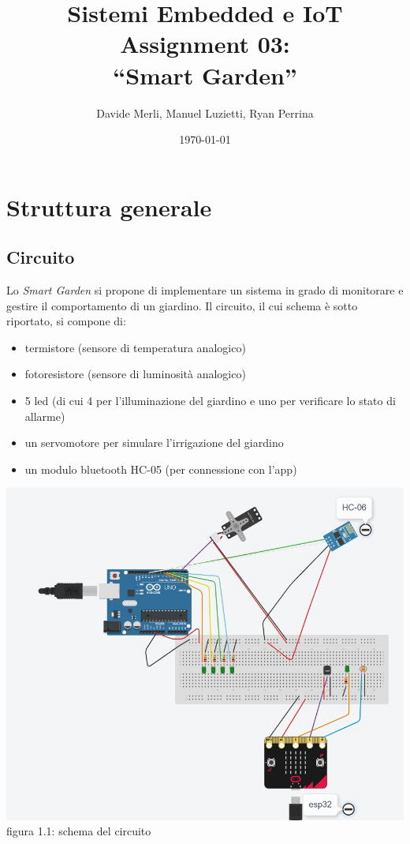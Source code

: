\documentclass[a4paper,12pt]{report}
\title{Sistemi Embedded e IoT\\Assignment 03:\\``Smart Garden''}
\author{Davide Merli, Manuel Luzietti, Ryan Perrina}
\date{\today}
\begin{document}
\maketitle
\tableofcontents

\chapter{Struttura generale}

\section{Circuito}
Lo \textit{Smart Garden} si propone di implementare un sistema in grado di monitorare e gestire il comportamento di un giardino. Il circuito, il cui schema è sotto riportato, si compone di:
\begin{itemize}
	\item termistore (sensore di temperatura analogico)
	\item fotoresistore (sensore di luminosità analogico)
	\item 5 led (di cui 4 per l'illuminazione del giardino e uno per verificare lo stato di allarme)
	\item un servomotore per simulare l'irrigazione del giardino
	\item un modulo bluetooth HC-05 (per connessione con l'app)
\end{itemize}

\begin{center}
	\includegraphics[scale = 0.454]{SchemaCircuito}
	\\figura 1.1: schema del circuito
\end{center}
\end{document}
